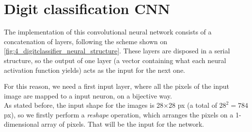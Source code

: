 	\section{Digit classification CNN}
		\label{sec:4_classif_cnn}
		The implementation of this convolutional neural network consists of a concatenation of layers, following the scheme shown on \autoref{fig:4_digitclassifier_neural_structure}. These layers are disposed in a serial structure, so the output of one layer (a vector containing what each neural activation function yields) acts as the input for the next one.
		
		For this reason, we need a first input layer, where all the pixels of the input image are mapped to a input neuron, on a bijective way.\\
		
		As stated before, the input shape for the images is 28$\times$28 px (a total of $28^2 = 784$ px), so we firstly perform a \emph{reshape} operation, which arranges the pixels on a 1-dimensional array of pixels. That will be the input for the network.
		
